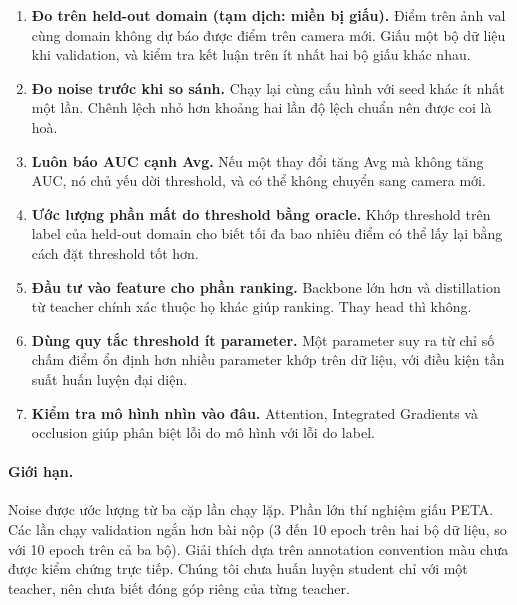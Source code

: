 \documentclass[11pt,a4paper]{article}
\begin{document}
\begin{enumerate}[leftmargin=1.4em]
\item \textbf{Đo trên held-out domain (tạm dịch: miền bị giấu).} Điểm trên ảnh val cùng domain không dự báo được điểm trên camera mới. Giấu một bộ dữ liệu khi validation, và kiểm tra kết luận trên ít nhất hai bộ giấu khác nhau.
\item \textbf{Đo noise trước khi so sánh.} Chạy lại cùng cấu hình với seed khác ít nhất một lần. Chênh lệch nhỏ hơn khoảng hai lần độ lệch chuẩn nên được coi là hoà.
\item \textbf{Luôn báo AUC cạnh Avg.} Nếu một thay đổi tăng Avg mà không tăng AUC, nó chủ yếu dời threshold, và có thể không chuyển sang camera mới.
\item \textbf{Ước lượng phần mất do threshold bằng oracle.} Khớp threshold trên label của held-out domain cho biết tối đa bao nhiêu điểm có thể lấy lại bằng cách đặt threshold tốt hơn.
\item \textbf{Đầu tư vào feature cho phần ranking.} Backbone lớn hơn và distillation từ teacher chính xác thuộc họ khác giúp ranking. Thay head thì không.
\item \textbf{Dùng quy tắc threshold ít parameter.} Một parameter suy ra từ chỉ số chấm điểm ổn định hơn nhiều parameter khớp trên dữ liệu, với điều kiện tần suất huấn luyện đại diện.
\item \textbf{Kiểm tra mô hình nhìn vào đâu.} Attention, Integrated Gradients và occlusion giúp phân biệt lỗi do mô hình với lỗi do label.
\end{enumerate}

\paragraph{Giới hạn.} Noise được ước lượng từ ba cặp lần chạy lặp. Phần lớn thí nghiệm giấu PETA. Các lần chạy validation ngắn hơn bài nộp (3 đến 10 epoch trên hai bộ dữ liệu, so với 10 epoch trên cả ba bộ). Giải thích dựa trên annotation convention màu chưa được kiểm chứng trực tiếp. Chúng tôi chưa huấn luyện student chỉ với một teacher, nên chưa biết đóng góp riêng của từng teacher.
\end{document}
